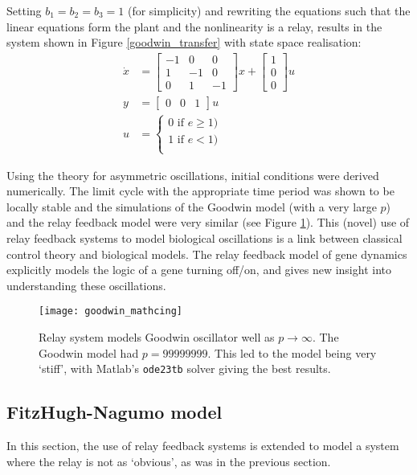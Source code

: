 \documentclass[a4paper, 12pt]{article}
\begin{document}
Setting $b_1 = b_2 = b_3 = 1$ (for simplicity) and rewriting the equations such that the linear equations form the plant and the nonlinearity is a relay, results in the system shown in Figure \ref{goodwin_transfer} with state space realisation: 
\begin{align}\label{eq:goodwin_relay_state_space}
\dot{x} &= \begin{bmatrix}
-1 & 0 & 0 \\  1  & -1 & 0 \\ 0 & 1 & -1
\end{bmatrix}x + \begin{bmatrix}1 \\0 \\0 \end{bmatrix}u \\
y &= \begin{bmatrix} 0 & 0 & 1 \end{bmatrix} u\\
u &=\begin{cases} 	               0 \text{ if } e \geq 1)\\
	                1 \text{ if } e < 1)\\\end{cases}
\end{align}

Using the theory for asymmetric oscillations, initial conditions were derived numerically. The limit cycle with the appropriate time period was shown to be locally stable and the simulations of the Goodwin model (with a very large $p$) and the relay feedback model were very similar (see Figure \ref{goodwin_matching}). This (novel) use of relay feedback systems to model biological oscillations is a link between classical control theory and biological models. The relay feedback model of gene dynamics explicitly models the logic of a gene turning off/on, and gives new insight into understanding these oscillations. 

\begin{figure}[h!]
\texttt{[image: goodwin\_mathcing]}
\caption{Relay system models Goodwin oscillator well as $p\rightarrow\infty$. The Goodwin model had $p = 99999999$. This led to the model being very `stiff', with Matlab's \texttt{ode23tb} solver giving the best results.}
\label{goodwin_matching}
\end{figure}

\FloatBarrier
\subsection{FitzHugh-Nagumo model}
In this section, the use of relay feedback systems is extended to model a system where the relay is not as `obvious', as was in the previous section.
\end{document}

